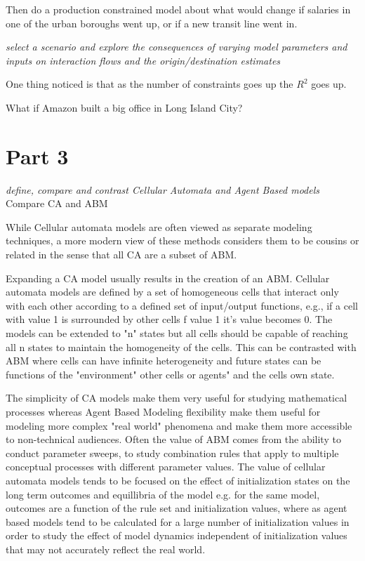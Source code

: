 \documentclass[11pt]{article} %
\begin{document}
Then do a production constrained model about what would change if salaries in one of the urban boroughs went up, or if a new transit line went in. 

\textit{select a scenario and explore the consequences of varying model parameters and inputs on interaction flows and the origin/destination estimates}

One thing noticed is that as the number of constraints goes up the $R^2$ goes up. 



What if Amazon built a big office in Long Island City? 




\section{Part 3}

\textit{define, compare and contrast Cellular Automata and Agent Based models}
Compare CA and ABM

While Cellular automata models are often viewed as separate modeling techniques, a more modern view of these methods considers them to be cousins or related in the sense that all CA are a subset of ABM. 

Expanding a CA model usually results in the creation of an ABM.  Cellular automata models are defined by a set of homogeneous cells that interact only with each other according to a defined set of input/output functions, e.g., if a cell with value 1 is surrounded by other cells f value 1 it's value becomes 0. The models can be extended to "n" states but all cells should be capable of reaching all n states to maintain the homogeneity of the cells. This can be contrasted with ABM where cells can have infinite heterogeneity and future states can be functions of the "environment" other cells or agents" and the cells own state. 

The simplicity of CA models make them very useful for studying mathematical processes whereas Agent Based Modeling flexibility make them useful for modeling more complex "real world" phenomena and make them more accessible to non-technical audiences. Often the value of ABM comes from the ability to conduct parameter sweeps, to study combination rules that apply to multiple conceptual processes with different parameter values. The value of cellular automata models tends to be focused on the effect of initialization states on the long term outcomes and equillibria of the model e.g. for the same model, outcomes are a function of the rule set and initialization values, where as agent based models tend to be calculated for a large number of initialization values in order to study the effect of model dynamics independent of initialization values that may not accurately reflect the real world. 
\end{document}
